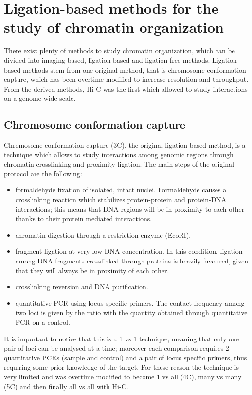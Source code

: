 \begin{figure}
  \label{fig:chromatin}
\end{figure}

\section{Ligation-based methods for the study of chromatin organization}

There exist plenty of methods to study chromatin organization, which can be divided into imaging-based, ligation-based and ligation-free methods. Ligation-based methods stem from one original method, that is chromosome conformation capture, which has been overtime modified to increase resolution and throughput. From the derived methods, Hi-C was the first which allowed to study interactions on a genome-wide scale.

\subsection{Chromosome conformation capture}
Chromosome conformation capture (3C), the original ligation-based method, is a technique which allows to study interactions among genomic regions through chromatin crosslinking and proximity ligation\cite{3coriginal2002}. The main steps of the original protocol are the following:
\begin{itemize}\tightlist
  \item formaldehyde fixation of isolated, intact nuclei. Formaldehyde causes a crosslinking reaction which stabilizes protein-protein and protein-DNA interactions; this means that DNA regions will be in proximity to each other thanks to their protein mediated interactions. 
  \item chromatin digestion through a restriction enzyme (EcoRI).
  \item fragment ligation at very low DNA concentration. In this condition, ligation among DNA fragments crosslinked through proteins is heavily favoured, given that they will always be in proximity of each other.
  \item crosslinking reversion and DNA purification.
  \item quantitative PCR using locus specific primers. The contact frequency among two loci is given by the ratio with the quantity obtained through quantitative PCR on a control.
\end{itemize}
It is important to notice that this is a 1 vs 1 technique, meaning that only one pair of loci can be analysed at a time; moreover each comparison requires 2 quantitative PCRs (sample and control) and a pair of locus specific primers, thus requiring some prior knowledge of the target. For these reason the technique is very limited and was overtime modified to become 1 vs all (4C\cite{4cprotocol2006}), many vs many (5C\cite{5cprotocol2006}) and then finally all vs all with Hi-C.



